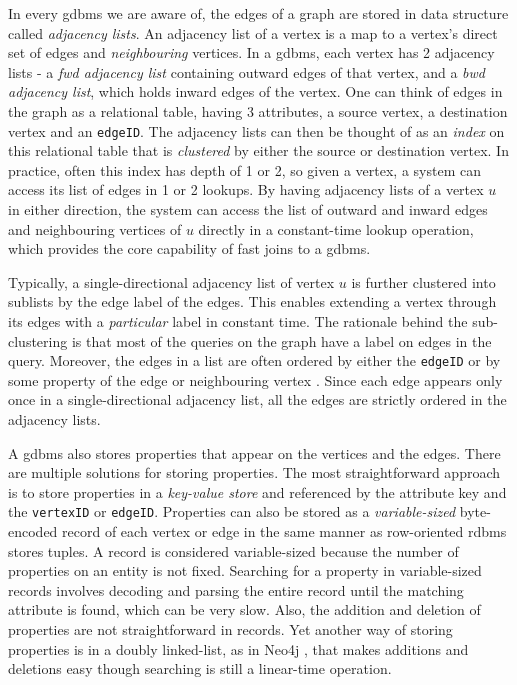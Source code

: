 In every \gls{gdbms} we are aware of, the edges of a graph are stored in data structure called \emph{adjacency lists}. An adjacency list of a vertex is a map to a vertex's direct set of edges and \emph{neighbouring} vertices. In a \gls{gdbms}, each vertex has 2 adjacency lists - a \emph{\gls{fwd} adjacency list} containing outward edges of that vertex, and a \emph{\gls{bwd} adjacency list}, which holds inward edges of the vertex. One can think of edges in the graph as a relational table, having 3 attributes, a source vertex, a destination vertex and an \texttt{edgeID}. The adjacency lists can then be thought of as an \emph{index} on this relational table that is \emph{clustered} by either the source or destination vertex. In practice, often this index has depth of 1 or 2, so given a vertex, a system can access its list of edges in 1 or 2 lookups. By having adjacency lists of a vertex $u$ in either direction, the system can access the list of outward and inward edges and neighbouring vertices of $u$ directly in a constant-time lookup operation, which provides the core capability of fast joins to a \gls{gdbms}. 

Typically, a single-directional adjacency list of vertex $u$ is further clustered into sublists by the edge label of the edges. This enables extending a vertex through its edges with a \emph{particular} label in constant time. The rationale behind the sub-clustering is that most of the queries on the graph have a label on edges in the query. Moreover, the edges in a list are often ordered by either the \texttt{edgeID} or by some property of the edge or neighbouring vertex \cite{a+indexes}. Since each edge appears only once in a single-directional adjacency list, all the edges are strictly ordered in the adjacency lists.

A \gls{gdbms} also stores properties that appear on the vertices and the edges. There are multiple solutions for storing properties. The most straightforward approach is to store properties in a \emph{key-value store} \cite{dgraph} and referenced by the attribute key and the \texttt{vertexID} or \texttt{edgeID}. Properties can also be stored as a \emph{variable-sized} byte-encoded record of each vertex or edge in the same manner as row-oriented \gls{rdbms} stores tuples. A record is considered variable-sized because the number of properties on an entity is not fixed. Searching for a property in variable-sized records involves decoding and parsing the entire record until the matching attribute is found, which can be very slow. Also, the addition and deletion of properties are not straightforward in records. Yet another way of storing properties is in a doubly linked-list, as in Neo4j \cite{neo4j}, that makes additions and deletions easy though searching is still a linear-time operation.

